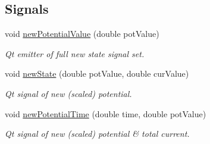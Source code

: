 \subsection*{Signals}
\begin{DoxyCompactItemize}
\item 
void \hyperlink{class_oscillator_a065af90ddd004f7af4e1d7489b4ea5d6}{new\+Potential\+Value} (double pot\+Value)
\begin{DoxyCompactList}\small\item\em Qt emitter of full new state signal set. \end{DoxyCompactList}\item 
void \hyperlink{class_oscillator_aa48179145afe4bad7b757eefecb6053a}{new\+State} (double pot\+Value, double cur\+Value)
\begin{DoxyCompactList}\small\item\em Qt signal of new (scaled) potential. \end{DoxyCompactList}\item 
void \hyperlink{class_oscillator_a949a6e88a1e5b7037ba93d6a9c927b4f}{new\+Potential\+Time} (double time, double pot\+Value)
\begin{DoxyCompactList}\small\item\em Qt signal of new (scaled) potential \& total current. \end{DoxyCompactList}\end{DoxyCompactItemize}

